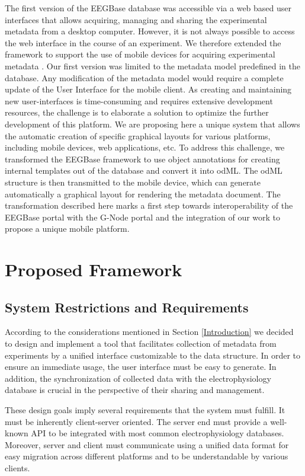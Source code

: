 \documentclass[conference]{IEEEtran}
\begin{document}
The first version of the EEGBase database was accessible via a web based user interfaces that allows acquiring, managing and sharing the experimental metadata from a desktop computer. However, it is not always possible to access the web interface in the course of an experiment. We therefore extended the framework to support the use of mobile devices for acquiring experimental metadata \cite{10.3389/fninf.2014.00020}. Our first version was limited to the metadata model predefined in the database. Any modification of the metadata model would require a complete update of the User Interface for the mobile client.
As creating and maintaining new user-interfaces is time-consuming and requires extensive development resources, the challenge is to elaborate a solution to optimize the further development of this platform. We are proposing here a unique system that allows the automatic creation of specific graphical layouts for various platforms, including mobile devices, web applications, etc. To address this challenge, we transformed the EEGBase framework to use object annotations \cite{6645264} for creating internal templates out of the database and convert it into odML. The odML structure is then transmitted to the mobile device, which can generate automatically a graphical layout for rendering the metadata document.
The transformation described here marks a first step towards interoperability of the EEGBase portal with the G-Node portal and the integration of our work to propose a unique mobile platform.

\section{Proposed Framework}\label{Framework}

\subsection{System Restrictions and Requirements}

According to the considerations mentioned in Section \ref{Introduction} we decided to design and implement a tool that facilitates collection of metadata from experiments by a unified interface customizable to the data structure. In order to ensure an immediate usage, the user interface must be easy to generate. In addition, the synchronization of collected data with the electrophysiology database is crucial in the perspective of their sharing and management.

These design goals imply several requirements that the system must fulfill. It must be inherently client-server oriented. The server end must provide a well-known API to be integrated with most common electrophysiology databases. Moreover, server and client must communicate using a unified data format for easy migration across different platforms and to be understandable by various clients.
\end{document}
